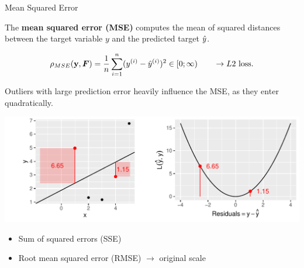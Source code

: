 \begin{vbframe}{Mean Squared Error}

The \textbf{mean squared error (MSE)} computes the mean of squared distances 
between the target variable $y$ and the predicted target $\hat{y}$.

$$
\rho_{MSE}(\mathbf{y}, \boldsymbol{F}) = \frac{1}{n} \sum\limits_{i=1}^n (y^{(i)} - \hat{y}^{(i)})^2 \in [0;\infty) \qquad \rightarrow L2 \text{ loss}.
$$

\begin{minipage}[c]{0.33\textwidth}
  \raggedright
  \small
  Outliers with large prediction error heavily influence the MSE, as they 
  enter quadratically.
\end{minipage}%
\begin{minipage}[c]{0.67\textwidth}
  \begin{knitrout}\scriptsize
  \color{fgcolor}
  {\includegraphics[width=\textwidth]{figure/plot_quad_loss}}
\end{knitrout}
\end{minipage}


\small

\begin{itemize}
  \small
  \item Sum of squared errors (SSE)
  \item Root mean squared error (RMSE) $\rightarrow$ original scale
\end{itemize}

\end{vbframe}


